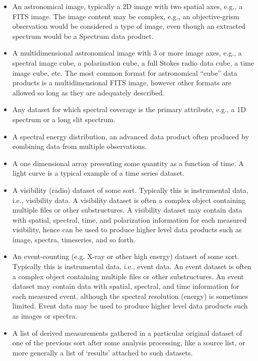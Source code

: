 \documentclass[11pt,a4paper]{ivoa}
\begin{document}
\begin{itemize}
\item[\textbf{image}] An astronomical image, typically a 2D image with two spatial axes, e.g., a FITS image.  The image content
may be complex, e.g., an objective-grism observation would be considered a type of image, even though an extracted
spectrum would be a Spectrum data product.
\item[\textbf{cube}]  A multidimensional astronomical image with 3 or more image axes, e.g., a spectral image cube, a polarization
cube, a full Stokes radio data cube, a time image cube, etc.  The most common format for astronomical ``cube'' data
products is a multidimensional FITS image, however other formats are allowed so long as they are adequately described.
\item[\textbf{spectrum}] Any dataset for which spectral coverage is the primary attribute, e.g., a 1D spectrum or a long slit
spectrum.
\item[\textbf{sed}]  A spectral energy distribution, an advanced data product often produced by combining data from multiple
observations.
\item[\textbf{timeseries}] A one dimensional array presenting some quantity as a function of time.  A light curve is a typical
example of a time series dataset.
\item[\textbf{visibility}] A visibility (radio) dataset of some sort.  Typically this is instrumental data, i.e.,
{\textquotedbl}visibility data{\textquotedbl}.  A visibility dataset is often a complex object containing multiple
files or other substructures.  A visibility dataset may contain data with spatial, spectral, time, and polarization
information for each measured visibility, hence can be used to produce higher level data products such as image,
spectra, timeseries, and so forth.
\item[\textbf{event}] An event-counting (e.g. X-ray or other high energy) dataset of some sort.  Typically this is instrumental
data, i.e., {\textquotedbl}event data{\textquotedbl}.  An event dataset is often a complex object containing multiple
files or other substructures.  An event dataset may contain data with spatial, spectral, and time information for each
measured event, although the spectral resolution (energy) is sometimes limited.  Event data may be used to produce
higher level data products such as images or spectra.
\item[\textbf{measurements}] A list of derived measurements gathered in a particular original dataset of one of the previous sort
after some analysis processing, like a source list, or more generally a list of `results' attached to such datasets.
\end{itemize}
\end{document}
